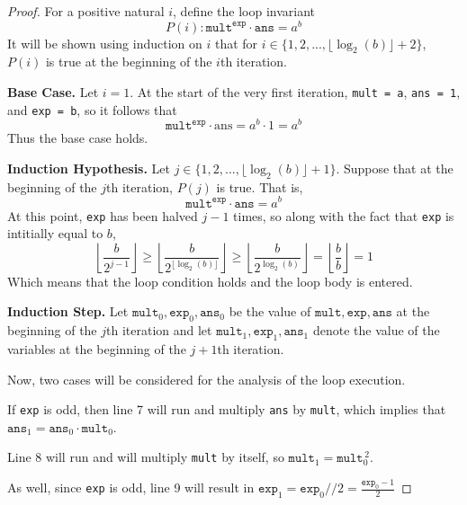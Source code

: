 \documentclass[11pt]{article}
\begin{document}
\begin{enumerate}[label=(\alph*)]
\begin{proof}
            For a positive natural \(i\), define the loop invariant
            \[
                P(i) : \texttt{mult}^\texttt{exp} \cdot \texttt{ans} = a^b
            \]
            It will be shown using induction on \(i\) that for \(i \in \{1, 2,..., \lfloor \log _2 (b) \rfloor + 2\}\), \(P(i)\) is true at the beginning of the \(i\)th iteration.

            \textbf{Base Case.} Let \(i=1\). At the start of the very first iteration, \verb|mult = a|, \verb|ans = 1|, and \verb|exp = b|, so it follows that
            \[
                \texttt{mult}^\texttt{exp} \cdot \text{ans} = a^b \cdot 1 = a^b
            \]
            Thus the base case holds.

            \textbf{Induction Hypothesis.} Let \(j \in \{1,2,..., \lfloor \log _2(b) \rfloor + 1\}\). Suppose that at the beginning of the \(j\)th iteration, \(P(j)\) is true. That is,
            \[
                \texttt{mult}^\texttt{exp} \cdot \texttt{ans} = a^b
            \]
            At this point, \verb|exp| has been halved \(j-1\) times, so along with the fact that \verb|exp| is intitially equal to \(b\),
            \[
                \left\lfloor \frac{b}{2^{j-1}} \right\rfloor \geq \left\lfloor \frac{b}{2^{\lfloor \log _2(b) \rfloor}} \right\rfloor \geq \left\lfloor \frac{b}{2^{\log _2(b)}} \right\rfloor = \left\lfloor \frac{b}{b} \right\rfloor = 1
            \]
            Which means that the loop condition holds and the loop body is entered.

            \textbf{Induction Step.} Let \(\texttt{mult}_{0},\texttt{exp}_{0},\texttt{ans}_{0}\) be the value of  \(\texttt{mult},\texttt{exp},\texttt{ans}\) at the beginning of the \(j\)th iteration and let \(\texttt{mult}_{1},\texttt{exp}_{1},\texttt{ans}_{1}\) denote the value of the variables at the beginning of the \(j+1\)th iteration.

            Now, two cases will be considered for the analysis of the loop execution.

            If \verb|exp| is odd, then line 7 will run and multiply \verb|ans| by \verb|mult|, which implies that \(\texttt{ans}_1 = \texttt{ans}_0 \cdot \texttt{mult}_0\).

            Line 8 will run and will multiply \verb|mult| by itself, so \(\texttt{mult}_1 = \texttt{mult}_0^{\, 2}\).
            
            As well, since \verb|exp| is odd, line 9 will result in \(\texttt{exp}_1 = \texttt{exp}_0 // 2 = \frac{\texttt{exp}_0 - 1}{2}\)


\end{proof}
\end{enumerate}
\end{document}
